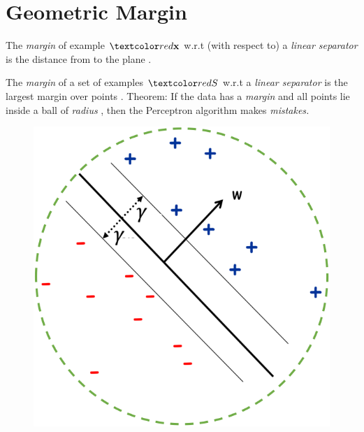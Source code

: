 \documentclass[
	number={2},
	title={Learning Linear Separators{,} SVMs and Kernels}
]{cs584notes}
\begin{document}
\section{Geometric Margin}\label{sec:geometric-margin}
\begin{minipage}[m]{0.72\textwidth}
	The \emph{margin} of example $\data{\vec{x}}$ w.r.t (with respect to) a \emph{linear separator}  is the distance from  to the plane .

	The \emph{margin} \data{$\gamma$} of a set of examples $\data{S}$ w.r.t a \emph{linear separator}  is the largest margin over points .
	Theorem: If the data has a \emph{margin} \data{$\gamma$} and all points lie inside a ball of \emph{radius} , then the Perceptron algorithm makes  \emph{mistakes.}
\end{minipage}\hfill%
\begin{minipage}[m]{0.25\textwidth}
	\begin{figure}[H]
		\centering
		\includegraphics[width=\textwidth]{figures/2/geometric_margin}
		\caption{}
		\label{fig:geometric-margin}
	\end{figure}

\end{minipage}
\end{document}
